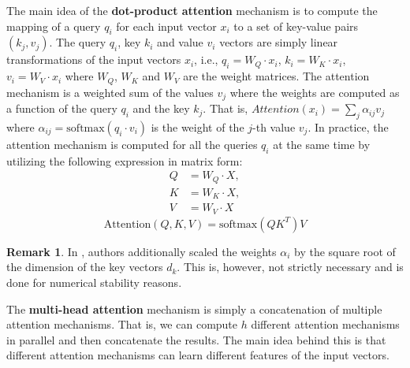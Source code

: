 \documentclass[a4paper, twoside]{report}
\theoremstyle{definition}
\newtheorem{remark}[theorem]{Remark}
\numberwithin{equation}{section}
\begin{document}

The main idea of the \textbf{dot-product attention} mechanism is to compute the mapping of a query $q_i$ for each input vector $x_i$ to a set of key-value pairs $(k_j, v_j)$.
The query $q_i$, key $k_i$ and value $v_i$ vectors are simply linear transformations of the input vectors $x_i$,
i.e., $q_i=W_Q\cdot x_i$, $k_i=W_K\cdot x_i$, $v_i=W_V\cdot x_i$ where $W_Q$, $W_K$ and $W_V$ are the weight matrices.
The attention mechanism is a weighted sum of the values $v_j$ where the weights are computed as a function of the query $q_i$ and the key $k_j$.
That is, $Attention(x_i)=\sum_j \alpha_{ij} v_j$ where $\alpha_{ij}=\text{softmax}(q_i \cdot v_i)$ is the weight of the $j$-th value $v_j$.
In practice, the attention mechanism is computed for all the queries $q_i$ at the same time by utilizing the following expression in matrix form:
\begin{equation}
    \begin{array}{rll}
        Q & = W_Q \cdot X, \\
        K & = W_K \cdot X, \\
        V & = W_V \cdot X
    \end{array}
\end{equation}
\begin{equation}\label{eq:dot_product_attention_matrix}
    \text{Attention}(Q, K, V)=\text{softmax}(Q K^T) V
\end{equation}

\begin{remark}
    In \cite{1706.03762}, authors additionally scaled the weights $\alpha_i$ by the square root of the dimension of the key vectors $d_k$.
    This is, however, not strictly necessary and is done for numerical stability reasons.
\end{remark}

The \textbf{multi-head attention} mechanism is simply a concatenation of multiple attention mechanisms.
That is, we can compute $h$ different attention mechanisms in parallel and then concatenate the results.
The main idea behind this is that different attention mechanisms can learn different features of the input vectors.
\end{document}
